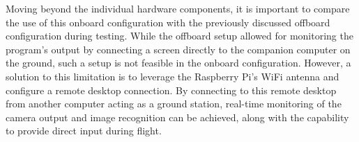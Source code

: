 Moving beyond the individual hardware components, it is important to compare the use of this onboard configuration with the previously discussed offboard configuration during testing. While the offboard setup allowed for monitoring the program's output by connecting a screen directly to the companion computer on the ground, such a setup is not feasible in the onboard configuration. However, a solution to this limitation is to leverage the Raspberry Pi's WiFi antenna and configure a remote desktop connection. By connecting to this remote desktop from another computer acting as a ground station, real-time monitoring of the camera output and image recognition can be achieved, along with the capability to provide direct input during flight.